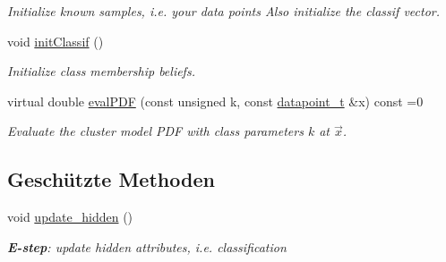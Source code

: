 \begin{DoxyCompactItemize}
\begin{DoxyCompactList}\small\item\em Initialize known samples, i.e. your data points Also initialize the classif vector. \item\end{DoxyCompactList}\item 
void \hyperlink{classCDA_1_1FitMulticlassByEM_a10d9a6e699530aa071dd33ea7b980f53}{initClassif} ()
\begin{DoxyCompactList}\small\item\em Initialize class membership beliefs. \item\end{DoxyCompactList}\item 
virtual double \hyperlink{classCDA_1_1FitMulticlassByEM_a5853c1889b12e567d2d9ab6c395dfe0d}{evalPDF} (const unsigned k, const \hyperlink{classCDA_1_1FitMulticlassByEM_a4828ccd2a6a7e66211588ceabdce4d70}{datapoint\_\-t} \&x) const =0
\begin{DoxyCompactList}\small\item\em Evaluate the cluster model PDF with class parameters $k$ at $\vec{x}$. \item\end{DoxyCompactList}\end{DoxyCompactItemize}
\subsection*{Geschützte Methoden}
\begin{DoxyCompactItemize}
\item 
void \hyperlink{classCDA_1_1FitMulticlassByEM_a7c40c5528a4b8b32e2455056f60d76de}{update\_\-hidden} ()
\begin{DoxyCompactList}\small\item\em {\bfseries E-\/step}: update hidden attributes, i.e. classification \item\end{DoxyCompactList}\end{DoxyCompactItemize}
